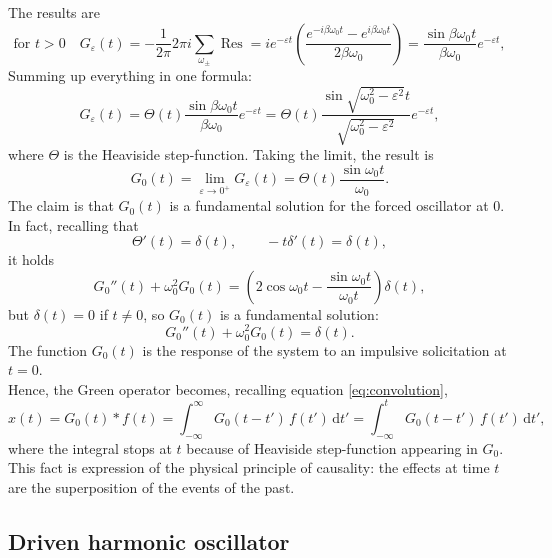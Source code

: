 \documentclass[a4paper,11pt]{article}	%
\theoremstyle{classicthm}
\theoremstyle{definition}
\theoremstyle{definition}
\newcommand{\dd}{\mathrm d}
\renewcommand{\epsilon}{\varepsilon}
\begin{document}
\noindent The results are 
\[	\text{for } t>0\quad  G_\epsilon(t)=-\frac1{2\pi}2\pi i\sum_{\omega_\pm}\operatorname{Res}= ie^{-\epsilon t}\left(\frac{e^{-i\beta\omega_0t}-e^{i\beta\omega_0t}}{2\beta\omega_0}\right)= \frac{\sin\beta\omega_0t}{\beta\omega_0}e^{-\epsilon t},		\]
Summing up everything in one formula:
\begin{equation}
 G_\epsilon(t)= \Theta( t)\frac{\sin\beta\omega_0t}{\beta\omega_0}e^{-\epsilon t}=\Theta( t)\frac{\sin\sqrt{\omega_0^2-\epsilon^2}t}{\sqrt{\omega_0^2-\epsilon^2}}e^{-\epsilon t},
\label{eq:integralone}
\end{equation}
where $\Theta$ is the Heaviside step-function. Taking the limit, the result is
\begin{equation}
	G_0(t)=\lim_{\epsilon\to 0^+}G_\epsilon(t)=\Theta( t)\frac{\sin\omega_0t}{\omega_0}.
\end{equation}
The claim is that $G_0(t)$ is a fundamental solution for the forced oscillator at $0$. In fact, recalling that
\[	\Theta'(t)=\delta(t),\qquad	-t\delta'(t)=\delta(t),		\]
it holds
\[	G_0''(t)+\omega_0^2G_0(t)=\left(2\cos\omega_0 t-\frac{\sin\omega_0 t}{\omega_0 t}\right)\delta(t),		\]
but $\delta(t)=0$ if $t\neq 0$, so $G_0(t)$ is a fundamental solution:
\[	G_0''(t)+\omega_0^2G_0(t)=\delta(t).		\]
The function $G_0(t)$ is the response of the system to an impulsive solicitation at $t=0$.\\
Hence, the Green operator becomes, recalling equation \eqref{eq:convolution},
\[	x(t)=G_0(t)*f(t)=\int_{-\infty}^{\infty}G_0(t-t')\,f(t')\,\dd t'=\int_{-\infty}^{t}G_0(t-t')\,f(t')\,\dd t',		\]
where the integral stops at $t$ because of Heaviside step-function appearing in $G_0$.\\
This fact is expression of the physical principle of causality: the effects at time $t$ are the superposition of the events of the past.

\subsection{Driven harmonic oscillator}
\end{document}
